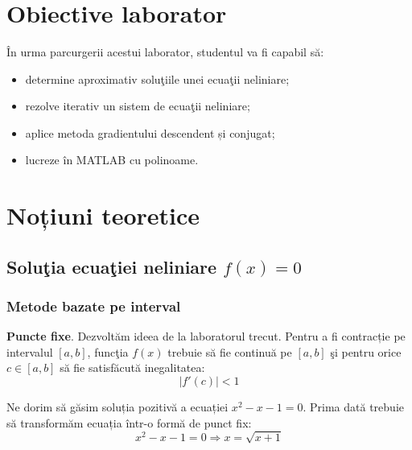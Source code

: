 \documentclass{exam}
\title{
\textmd{\textbf{\MNLabTitle}}
\author{}
\date{}
}
\begin{document}
\begin{coverpages}
	\maketitle
	\thispagestyle{empty}
	\tableofcontents
\end{coverpages}

\section{Obiective laborator}
În urma parcurgerii acestui laborator, studentul va fi capabil să:
\begin{itemize}
	\item determine aproximativ soluţiile unei ecuaţii neliniare;
	\item rezolve iterativ un sistem de ecuaţii neliniare;
	\item aplice metoda gradientului descendent și conjugat;
	\item lucreze în MATLAB cu polinoame.
\end{itemize}

\section{Noțiuni teoretice}

\subsection{Soluţia ecuaţiei neliniare $f(x) = 0$}

\subsubsection{Metode bazate pe interval}

\textbf{Puncte fixe}. Dezvoltăm ideea de la laboratorul trecut. Pentru a fi
contracție pe intervalul $[a, b]$, funcţia $f(x)$ trebuie să fie continuă pe
$[a, b]$ şi pentru orice $c \in [a, b]$ să fie satisfăcută inegalitatea:
\begin{equation*}
	|f'(c)| < 1
\end{equation*}

Ne dorim să găsim soluția pozitivă a ecuației $x^2 - x - 1 = 0$. Prima dată
trebuie să transformăm ecuația într-o formă de punct fix:
\begin{equation*}
	x^2 - x - 1 = 0 \Rightarrow x = \sqrt{x + 1}
\end{equation*}
\end{document}
